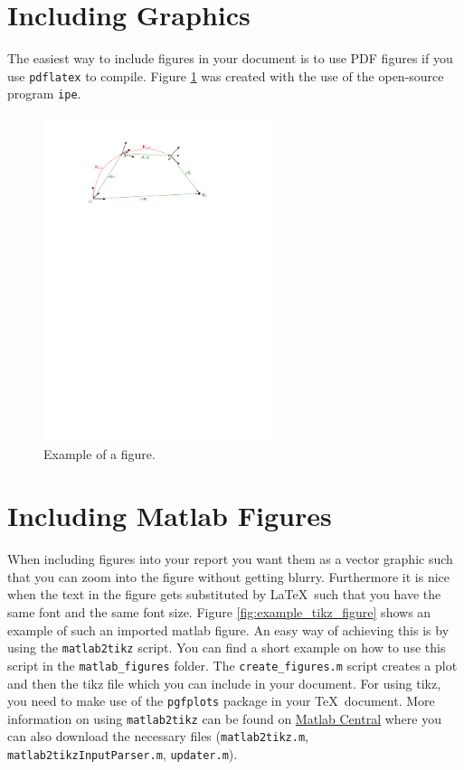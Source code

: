 \section{Including Graphics}\label{sec:epsgraph}

The easiest way to include figures in your document is to use PDF figures if you use \texttt{pdflatex} to compile.
Figure \ref{img:notation} was created with the use of the open-source program \texttt{ipe}.

  \begin{figure}[h]
     \centering
     \includegraphics[width=0.6\textwidth]{img/notation.pdf}
     \caption{Example of a figure.}
     \label{img:notation}
  \end{figure}

\section{Including Matlab Figures}

When including figures into your report you want them as a vector graphic such that you can zoom into the figure without getting blurry.
Furthermore it is nice when the text in the figure gets substituted by \LaTeX\ such that you have the same font and the same font size.
Figure \ref{fig:example_tikz_figure} shows an example of such an imported matlab figure.
An easy way of achieving this is by using the \texttt{matlab2tikz} script.
You can find a short example on how to use this script in the \texttt{matlab\_figures} folder.
The \texttt{create\_figures.m} script creates a plot and then the tikz file which you can include in your document.
For using tikz, you need to make use of the \texttt{pgfplots} package in your \TeX\ document.
More information on using \texttt{matlab2tikz} can be found on \href{http://www.mathworks.com/matlabcentral/fileexchange/22022-matlab2tikz}{Matlab Central} where you can also download the necessary files (\texttt{matlab2tikz.m}, \texttt{matlab2tikzInputParser.m}, \texttt{updater.m}).

